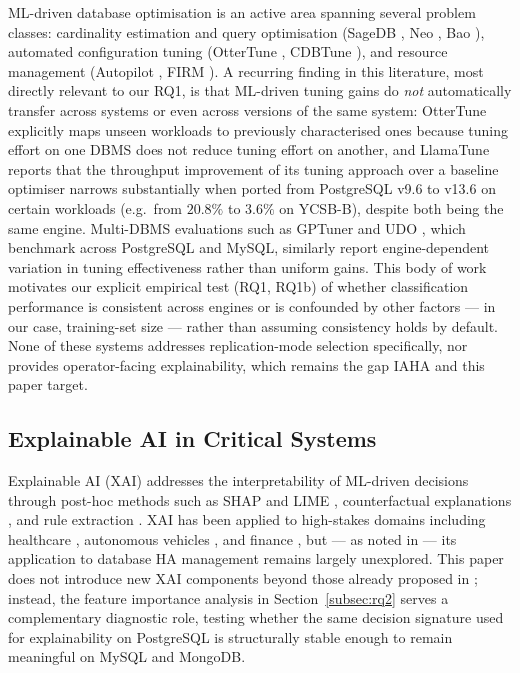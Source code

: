 \documentclass[iicol,pdflatex,sn-mathphys-num]{sn-jnl}
\theoremstyle{thmstyleone}
\theoremstyle{thmstylethree}
\begin{document}
ML-driven database optimisation is an active area spanning several
problem classes: cardinality estimation and query optimisation
(SageDB \cite{kraska2019}, Neo \cite{marcus2019}, Bao \cite{marcus2021}),
automated configuration tuning
(OtterTune \cite{vanaken2017}, CDBTune \cite{zhang2019}), and resource
management (Autopilot \cite{autopilot2020}, FIRM \cite{firm2020}). A
recurring finding in this literature, most directly relevant to our
RQ1, is that ML-driven tuning gains do \emph{not} automatically
transfer across systems or even across versions of the same system:
OtterTune \cite{vanaken2017} explicitly maps unseen workloads to
previously characterised ones because tuning effort on one DBMS does
not reduce tuning effort on another, and LlamaTune \cite{kanellis2022}
reports that the throughput improvement of its tuning approach over a
baseline optimiser narrows substantially when ported from PostgreSQL
v9.6 to v13.6 on certain workloads (e.g.\ from $20.8\%$ to $3.6\%$ on
YCSB-B), despite both being the same engine. Multi-DBMS evaluations
such as GPTuner \cite{lao2024} and UDO \cite{wang2021udo}, which
benchmark across PostgreSQL and MySQL, similarly report
engine-dependent variation in tuning effectiveness rather than uniform
gains. This body of work motivates our explicit empirical test (RQ1,
RQ1b) of whether classification performance is consistent across
engines or is confounded by other factors --- in our case, training-set
size --- rather than assuming consistency holds by default. None of
these systems addresses replication-mode selection specifically, nor
provides operator-facing explainability, which remains the gap
IAHA \cite{iaha2026} and this paper target.

\subsection{Explainable AI in Critical Systems}\label{subsec:xai}

Explainable AI (XAI) addresses the interpretability of ML-driven
decisions \cite{gunning2019} through post-hoc methods such as
SHAP \cite{lundberg2017} and LIME \cite{ribeiro2016}, counterfactual
explanations \cite{wachter2017}, and rule extraction \cite{guidotti2018}.
XAI has been applied to high-stakes domains including
healthcare \cite{holzinger2019}, autonomous vehicles \cite{atakishiyev2021},
and finance \cite{bussmann2020}, but --- as noted in \cite{iaha2026}
--- its application to database HA management remains largely
unexplored. This paper does not introduce new XAI components beyond
those already proposed in \cite{iaha2026}; instead, the feature
importance analysis in Section~\ref{subsec:rq2} serves a
complementary diagnostic role, testing whether the same decision
signature used for explainability on PostgreSQL is structurally stable
enough to remain meaningful on MySQL and MongoDB.
\end{document}
